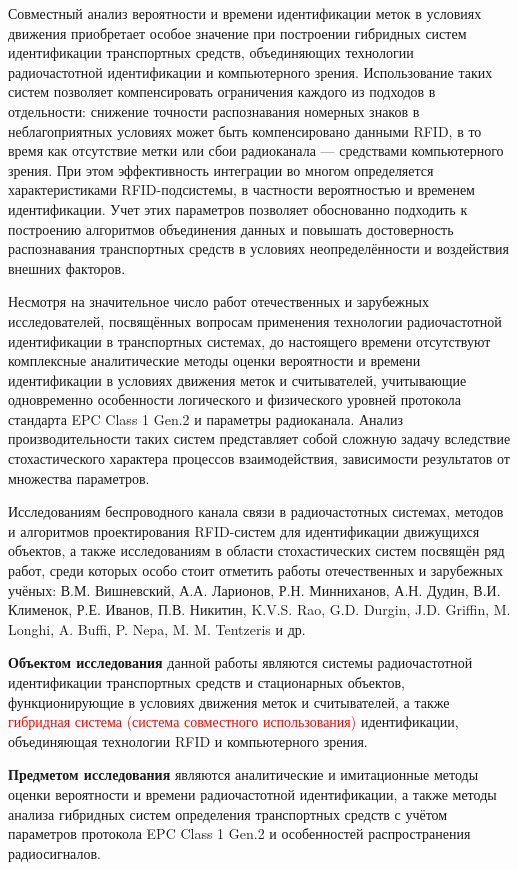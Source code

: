 \documentclass[12pt]{article}
\theoremstyle{definition}
\begin{document}
Совместный анализ вероятности и времени идентификации меток в условиях движения приобретает особое значение при построении гибридных систем идентификации транспортных средств, объединяющих технологии радиочастотной идентификации и компьютерного зрения. Использование таких систем позволяет компенсировать ограничения каждого из подходов в отдельности: снижение точности распознавания номерных знаков в неблагоприятных условиях может быть компенсировано данными RFID, в то время как отсутствие метки или сбои радиоканала — средствами компьютерного зрения. При этом эффективность интеграции во многом определяется характеристиками RFID-подсистемы, в частности вероятностью и временем идентификации. Учет этих параметров позволяет обоснованно подходить к построению алгоритмов объединения данных и повышать достоверность распознавания транспортных средств в условиях неопределённости и воздействия внешних факторов.

Несмотря на значительное число работ отечественных и зарубежных исследователей, посвящённых вопросам применения технологии радиочастотной идентификации в транспортных системах, до настоящего времени отсутствуют комплексные аналитические методы оценки вероятности и времени идентификации в условиях движения меток и считывателей, учитывающие одновременно особенности логического и физического уровней протокола стандарта EPC Class 1 Gen.2 и параметры радиоканала. Анализ производительности таких систем представляет собой сложную задачу вследствие стохастического характера процессов взаимодействия, зависимости результатов от множества параметров.

Исследованиям беспроводного канала связи в радиочастотных системах, методов и алгоритмов проектирования RFID-систем для идентификации движущихся объектов, а также исследованиям в области стохастических систем посвящён ряд работ, среди которых особо стоит отметить работы отечественных и зарубежных учёных: В.М. Вишневский, А.А. Ларионов, Р.Н. Минниханов, А.Н. Дудин, В.И. Клименок, Р.Е. Иванов, П.В. Никитин, K.V.S. Rao, G.D. Durgin, J.D. Griffin, M. Longhi, A. Buffi, P. Nepa, M. M. Tentzeris и др.

\textbf{Объектом исследования} данной работы являются системы радиочастотной идентификации транспортных средств и стационарных объектов, функционирующие в условиях движения меток и считывателей, а также \textcolor{red}{гибридная система (система совместного использования)} идентификации, объединяющая технологии RFID и компьютерного зрения.

\textbf{Предметом исследования} являются аналитические и имитационные методы оценки вероятности и времени радиочастотной идентификации, а также методы анализа гибридных систем определения транспортных средств с учётом параметров протокола EPC Class 1 Gen.2 и особенностей распространения радиосигналов.
\end{document}
